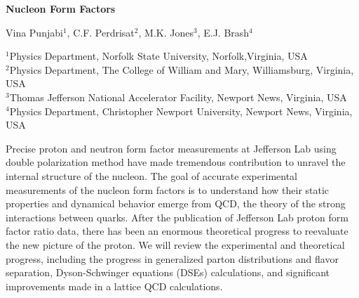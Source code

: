 \documentclass[12pt]{article}
\begin{document}
\begin{center}

{\bfseries Nucleon Form Factors}

\vspace{10pt}

Vina Punjabi$^1$, C.F. Perdrisat$^2$, M.K. Jones$^3$, E.J. Brash$^4$

\vspace{10pt}

$^1${Physics Department, Norfolk State University, Norfolk,Virginia, USA}\\
$^2${Physics Department, The College of William and Mary, Williamsburg, Virginia, USA}\\ 
$^3${Thomas Jefferson National Accelerator Facility, Newport News, Virginia, USA}\\
$^4${Physics Department, Christopher Newport University, Newport News, Virginia, USA}\\ 



\vspace{18pt} %

\end{center}
Precise proton and neutron form factor measurements at Jefferson Lab using double 
polarization method have made tremendous contribution to unravel the internal structure 
of the nucleon. The goal of accurate experimental measurements of the nucleon form factors is to
understand how their static properties and dynamical behavior emerge from QCD, the 
theory of the strong interactions between quarks. After the publication of Jefferson Lab 
proton form factor ratio data, there has been an enormous theoretical progress to reevaluate the
new picture of the proton. We will review the experimental and theoretical progress, including 
the progress in generalized parton distributions and flavor separation, Dyson-Schwinger 
equations (DSEs) calculations, and significant improvements made in a lattice QCD calculations. 


 
\end{document}
